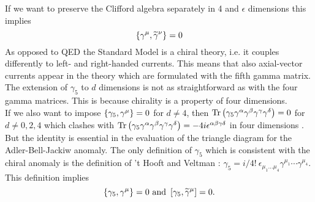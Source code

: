If we want to preserve the Clifford algebra separately in 4 and $\epsilon$ dimensions this implies
\begin{equation}
\left\lbrace \gamma^{\mu},\widetilde{\gamma}^{\nu} \right\rbrace = 0
\end{equation}
As opposed to QED the Standard Model is a chiral theory, i.e. it couples differently to left- and right-handed currents. This means that also axial-vector currents appear in the theory which are formulated with the fifth gamma matrix. The extension of $\gamma_5$ to $d$ dimensions is not as straightforward as with the four gamma matrices. This is because chirality is a property of four dimensions.\\
If we also want to impose $\left\lbrace \gamma_5,\gamma^{\mu} \right\rbrace = 0$ for $d \neq 4$, then $\mathrm{Tr}\left( \gamma_5 \gamma^{\alpha}\gamma^{\beta}\gamma^{\gamma}\gamma^{\delta} \right) = 0$  for $d \neq 0,2,4$ which clashes with $\mathrm{Tr}\left( \gamma_5 \gamma^{\alpha}\gamma^{\beta}\gamma^{\gamma}\gamma^{\delta} \right) = -4i \epsilon^{\alpha\beta\gamma\delta}$ in four dimensions \cite{Gamma5}. But the identity is essential in the evaluation of the triangle diagram for the Adler-Bell-Jackiw anomaly. The only definition of $\gamma_5$ which is consistent with the chiral anomaly is the definition of 't Hooft and Veltman \cite{HVgamma5}: $\gamma_5 = i/4! \ \epsilon_{\mu_1 \dots \mu_4} \gamma^{\mu_1} \cdots \gamma^{\mu_4}$. This definition implies
\begin{equation}
\left\lbrace \gamma_5, \gamma^{\mu} \right\rbrace = 0  \text{ and }  \left[ \gamma_5, \widetilde{\gamma}^{\mu} \right] = 0.
\end{equation} 




